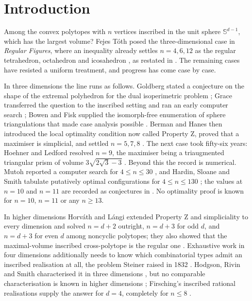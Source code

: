 \section{Introduction}
\label{sec:intro}

Among the convex polytopes with $n$ vertices inscribed in the unit sphere
$\mathbb{S}^{d-1}$, which has the largest volume? Fejes T\'{o}th posed the
three-dimensional case in \emph{Regular Figures}, where an inequality already
settles $n = 4, 6, 12$ as the regular tetrahedron, octahedron and icosahedron
\cite[p.~263]{fejes-toth-1964}, as restated in \cite{horvath-2016-survey}. The
remaining cases have resisted a uniform treatment, and progress has come case
by case.

In three dimensions the line runs as follows. Goldberg stated a conjecture on
the shape of the extremal polyhedron for the dual isoperimetric problem
\cite{goldberg-1935}; Grace transferred the question to the inscribed setting
and ran an early computer search \cite{grace-1963}; Bowen and Fisk supplied the
isomorph-free enumeration of sphere triangulations that made case analysis
possible \cite{bowen-fisk-1967}. Berman and Hanes then introduced the local
optimality condition now called Property Z, proved that a maximiser is
simplicial, and settled $n = 5, 7, 8$ \cite{berman-hanes-1970}. The next case
took fifty-six years: Hoehner and Ledford resolved $n = 9$, the maximiser being
a triaugmented triangular prism of volume $3\sqrt{2\sqrt{3}-3}$
\cite{hoehner-ledford-2026}. Beyond this the record is numerical. Mutoh
reported a computer search for $4 \leq n \leq 30$ \cite{mutoh-2003}, and
Hardin, Sloane and Smith tabulate putatively optimal configurations for
$4 \leq n \leq 130$ \cite{hardin-sloane-smith}; the values at $n = 10$ and
$n = 11$ are recorded as conjectures in \cite{oeis-a339262,oeis-a339263}. No
optimality proof is known for $n = 10$, $n = 11$ or any $n \geq 13$.

In higher dimensions Horv\'{a}th and L\'{a}ngi extended Property Z and
simpliciality to every dimension and solved $n = d+2$ outright, $n = d+3$ for
odd $d$, and $n = d+3$ for even $d$ among noncyclic polytopes; they also showed
that the maximal-volume inscribed cross-polytope is the regular one
\cite{horvath-langi-2016}. Exhaustive work in four dimensions additionally
needs to know which combinatorial types admit an inscribed realisation at all,
the problem Steiner raised in 1832 \cite{steiner-1832}. Hodgson, Rivin and
Smith characterised it in three dimensions
\cite{hodgson-rivin-smith-1992,dillencourt-smith-1996}, but no comparable
characterisation is known in higher dimensions \cite{padrol-ziegler-2016};
Firsching's inscribed rational realisations supply the answer for $d = 4$,
completely for $n \leq 8$ \cite{firsching-2017}.

